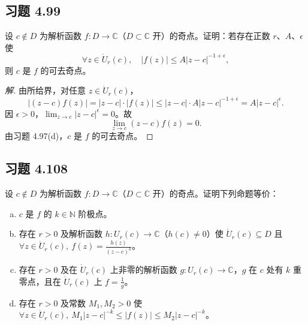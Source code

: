 \documentclass[11pt,a4paper]{article}
\newcommand{\C}{\mathbb{C}}
\newcommand{\N}{\mathbb{N}}
\theoremstyle{definition}
\newenvironment{solution}{\begin{proof}[解]}{\end{proof}}
\begin{document}
\subsection{习题 4.99}

设 $c \notin D$ 为解析函数 $f : D \to \C$（$D \subset \C$ 开）的奇点。证明：若存在正数 $r$、$A$、$\epsilon$ 使
\[
  \forall z \in \dot{U}_r(c), \quad |f(z)| \le A |z - c|^{-1 + \epsilon},
\]
则 $c$ 是 $f$ 的可去奇点。

\begin{solution}
  由所给界，对任意 $z \in \dot{U}_r(c)$，
  \[
    |(z - c)f(z)| = |z - c| \cdot |f(z)|
    \le |z - c| \cdot A |z - c|^{-1 + \epsilon}
    = A |z - c|^{\epsilon}.
  \]
  因 $\epsilon > 0$，$\lim_{z \to c} |z - c|^{\epsilon} = 0$。故
  \[
    \lim_{z \to c} (z - c)f(z) = 0.
  \]
  由习题 4.97(d)，$c$ 是 $f$ 的可去奇点。
\end{solution}

\subsection{习题 4.108}

设 $c \notin D$ 为解析函数 $f : D \to \C$（$D \subset \C$ 开）的奇点。证明下列命题等价：
\begin{enumerate}[(a)]
  \item $c$ 是 $f$ 的 $k \in \N$ 阶极点。
  \item 存在 $r > 0$ 及解析函数 $h : U_r(c) \to \C$（$h(c) \ne 0$）使 $\dot{U}_r(c) \subseteq D$ 且 $\forall z \in \dot{U}_r(c),\ f(z) = \frac{h(z)}{(z-c)^k}$。
  \item 存在 $r > 0$ 及在 $\dot{U}_r(c)$ 上非零的解析函数 $g : U_r(c) \to \C$，$g$ 在 $c$ 处有 $k$ 重零点，且在 $\dot{U}_r(c)$ 上 $f = \frac{1}{g}$。
  \item 存在 $r > 0$ 及常数 $M_1, M_2 > 0$ 使 $\forall z \in \dot{U}_r(c),\ M_1 |z-c|^{-k} \le |f(z)| \le M_2 |z-c|^{-k}$。
\end{enumerate}
\end{document}
